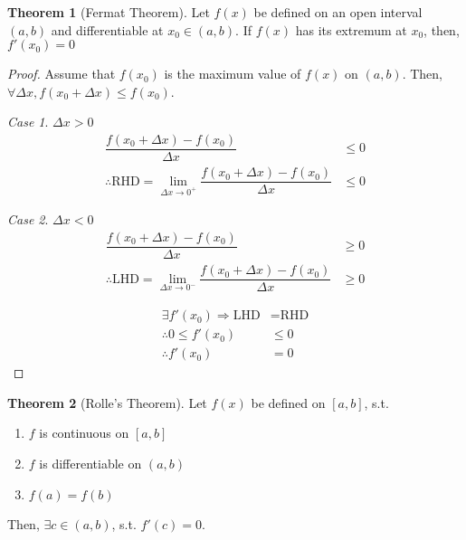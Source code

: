 \documentclass[fleqn]{article}
\theoremstyle{definition}
\theoremstyle{theorem}
\newtheorem{theorem}{Theorem}
\theoremstyle{remark}
\newtheorem{case}{Case}
\begin{document}
\begin{theorem}[Fermat Theorem] \label{Fermat Theorem}
	Let $f(x)$ be defined on an open interval $(a, b)$ and differentiable at $x_0 \in (a,b)$. If $f(x)$ has its extremum at $x_0$, then, $f'(x_0) = 0$
\end{theorem}

\begin{proof}
	Assume that $f(x_0)$ is the maximum value of $f(x)$ on $(a, b)$. Then, $\forall \Delta x, f(x_0 + \Delta x) \leq f(x_0)$.
	
		\begin{case}
			$\Delta x > 0$
			\begin{align*}
				\dfrac{f(x_0 + \Delta x) - f(x_0)}{\Delta x} &\leq 0 \\
				\therefore \text{RHD} = \lim\limits_{\Delta x \rightarrow 0^+} \dfrac{f(x_0 + \Delta x) - f(x_0)}{\Delta x} &\leq 0
			\end{align*}
		\end{case}
	
	\begin{case}
		$\Delta x < 0$
		\begin{align*}
			\dfrac{f(x_0 + \Delta x) - f(x_0)}{\Delta x} &\geq 0 \\
			\therefore \text{LHD} = \lim\limits_{\Delta x \rightarrow 0^-} \dfrac{f(x_0 + \Delta x) - f(x_0)}{\Delta x} &\geq 0
		\end{align*}
	\end{case}
	
	\begin{align*}
	\exists f'(x_0) \Rightarrow \text{LHD} &= \text{RHD} \\
	\therefore 0 \leq f'(x_0) &\leq 0 \\
	\therefore f'(x_0) &= 0
	\end{align*}
\end{proof}

\begin{theorem}[Rolle's Theorem]
	Let $f(x)$ be defined on $[a, b]$, s.t. 
	\begin{enumerate}
		\item $f$ is continuous on $[a, b]$ \label{Rolle condition 1}
		\item $f$ is differentiable on $(a, b)$ \label{Rolle condition 2}
		\item $f(a) = f(b)$ \label{Rolle condition 3}
	\end{enumerate}
	Then, $\exists c \in (a, b)$, s.t. $f'(c) = 0$.
\end{theorem}
\end{document}
